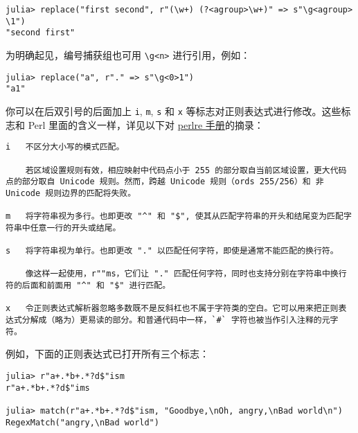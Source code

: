 \begin{verbatim}
julia> replace("first second", r"(\w+) (?<agroup>\w+)" => s"\g<agroup> \1")
"second first"
\end{verbatim}



为明确起见，编号捕获组也可用 \texttt{{\textbackslash}g<n>} 进行引用，例如：




\begin{verbatim}
julia> replace("a", r"." => s"\g<0>1")
"a1"
\end{verbatim}



你可以在后双引号的后面加上 \texttt{i}, \texttt{m}, \texttt{s} 和 \texttt{x} 等标志对正则表达式进行修改。这些标志和 Perl 里面的含义一样，详见以下对 \href{http://perldoc.perl.org/perlre.html\#Modifiers}{perlre 手册}的摘录：




\begin{lstlisting}
i   不区分大小写的模式匹配。

    若区域设置规则有效，相应映射中代码点小于 255 的部分取自当前区域设置，更大代码点的部分取自 Unicode 规则。然而，跨越 Unicode 规则（ords 255/256）和 非 Unicode 规则边界的匹配将失败。

m   将字符串视为多行。也即更改 "^" 和 "$", 使其从匹配字符串的开头和结尾变为匹配字符串中任意一行的开头或结尾。

s   将字符串视为单行。也即更改 "." 以匹配任何字符，即使是通常不能匹配的换行符。

    像这样一起使用，r""ms，它们让 "." 匹配任何字符，同时也支持分别在字符串中换行符的后面和前面用 "^" 和 "$" 进行匹配。

x   令正则表达式解析器忽略多数既不是反斜杠也不属于字符类的空白。它可以用来把正则表达式分解成（略为）更易读的部分。和普通代码中一样，`#` 字符也被当作引入注释的元字符。
\end{lstlisting}



例如，下面的正则表达式已打开所有三个标志：




\begin{verbatim}
julia> r"a+.*b+.*?d$"ism
r"a+.*b+.*?d$"ims

julia> match(r"a+.*b+.*?d$"ism, "Goodbye,\nOh, angry,\nBad world\n")
RegexMatch("angry,\nBad world")
\end{verbatim}




